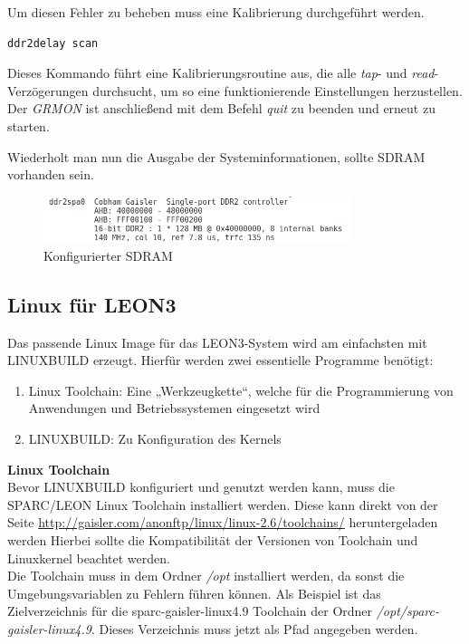 Um diesen Fehler zu beheben muss eine Kalibrierung durchgeführt werden.\\

\begin{lstlisting}[caption={Starten der Routine},label={code:ddr2delay}]
ddr2delay scan
   \end{lstlisting}


Dieses Kommando führt eine Kalibrierungsroutine aus, die alle \emph{tap}- und \emph{read}-Verzögerungen durchsucht, um so eine funktionierende Einstellungen herzustellen.\\

Der \emph{GRMON} ist anschließend mit dem Befehl \emph{quit} zu beenden und erneut zu starten.

Wiederholt man nun die Ausgabe der Systeminformationen, sollte SDRAM vorhanden sein.

\begin{figure}[H]
\centering
\includegraphics[width=0.8\textwidth]{Hauptteil/sdram.png}
\caption{Konfigurierter SDRAM}
\label{fig:sdram}
\end{figure}


\newpage
\subsection{Linux für LEON3}\label{kap:linuxleon}

Das passende Linux Image für das LEON3-System wird am einfachsten mit LINUXBUILD erzeugt. Hierfür werden zwei essentielle Programme benötigt:
\begin{enumerate}
  \item Linux Toolchain: Eine „Werkzeugkette“, welche für die Programmierung von Anwendungen und Betriebssystemen eingesetzt wird
  \item LINUXBUILD: Zu Konfiguration des Kernels
\end{enumerate}

\vspace{2mm}

\textbf{Linux Toolchain}\\

Bevor LINUXBUILD konfiguriert und genutzt werden kann, muss die SPARC/LEON Linux Toolchain installiert werden.
Diese kann direkt von der Seite \url{ http://gaisler.com/anonftp/linux/linux-2.6/toolchains/} heruntergeladen werden Hierbei sollte die Kompatibilität der Versionen von Toolchain und Linuxkernel beachtet werden.\\
Die Toolchain muss in dem Ordner \emph{/opt} installiert werden, da sonst die Umgebungsvariablen zu Fehlern führen können. Als Beispiel ist das Zielverzeichnis für die sparc-gaisler-linux4.9 Toolchain der Ordner \emph{/opt/sparc-gaisler-linux4.9}.
Dieses Verzeichnis muss jetzt als Pfad angegeben werden.\\

